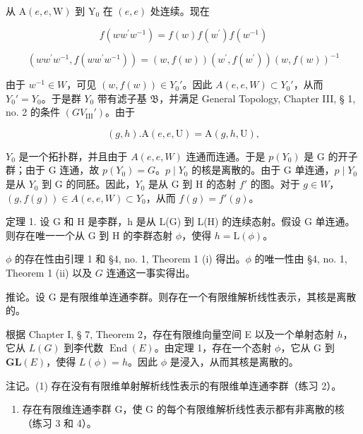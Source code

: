 从 \(\mathrm{A}(e,e,\mathrm{W})\) 到 \(\mathrm{Y}_0\) 在 \((e,e)\) 处连续。现在

\[
f \left(w w ^ {\prime} w ^ {- 1}\right) = f (w) f \left(w ^ {\prime}\right) f \left(w ^ {- 1}\right)
\]

\[
\left(w w ^ {\prime} w ^ {- 1}, f \left(w w ^ {\prime} w ^ {- 1}\right)\right) = (w, f (w)) \left(w ^ {\prime}, f \left(w ^ {\prime}\right)\right) \left(w, f (w)\right) ^ {- 1}
\]

由于 \(w^{-1} \in W\)，可见 \((w, f(w)) \in Y_0'\)。因此 \(A(e, e, W) \subset Y_0'\)，从而 \(Y_0' = Y_0\)。于是群 \(Y_0\) 带有滤子基 \(\mathfrak{B}\)，并满足 General Topology, Chapter III, § 1, no. 2 的条件 \((GV_{\mathrm{III}}')\)。由于

\[
(g, h). \mathrm{A} (e, e, \mathrm{U}) = \mathrm{A} (g, h, \mathrm{U}),
\]

\(Y_{0}\) 是一个拓扑群，并且由于 \(A(e, e, W)\) 连通而连通。于是 \(p(Y_{0})\) 是 G 的开子群；由于 G 连通，故 \(p(Y_{0}) = G\)。\(p \mid Y_{0}\) 的核是离散的。由于 G 单连通，\(p \mid Y_{0}\) 是从 \(Y_{0}\) 到 G 的同胚。因此，\(Y_{0}\) 是从 G 到 H 的态射 \(f'\) 的图。对于 \(g \in W\)，\((g, f(g)) \in A(e, e, W) \subset Y_{0}\)，从而 \(f(g) = f'(g)\)。

定理 1. 设 G 和 H 是李群，h 是从 L(G) 到 L(H) 的连续态射。假设 G 单连通。则存在唯一一个从 G 到 H 的李群态射 \(\phi\)，使得 \(h = \mathrm{L}(\phi)\)。

\(\phi\) 的存在性由引理 1 和 §4, no. 1, Theorem 1 (i) 得出。\(\phi\) 的唯一性由 §4, no. 1, Theorem 1 (ii) 以及 \(G\) 连通这一事实得出。

推论。设 G 是有限维单连通李群。则存在一个有限维解析线性表示，其核是离散的。

根据 Chapter I, § 7, Theorem 2，存在有限维向量空间 E 以及一个单射态射 \(h\)，它从 \(L(G)\) 到李代数 \(\operatorname{End}(E)\)。由定理 1，存在一个态射 \(\phi\)，它从 G 到 \(\mathbf{GL}(E)\)，使得 \(L(\phi) = h\)。因此 \(\phi\) 是浸入，从而其核是离散的。

注记。(1) 存在没有有限维单射解析线性表示的有限维单连通李群（练习 2）。

\begin{enumerate}
\def\labelenumi{(\arabic{enumi})}
\setcounter{enumi}{1}
\tightlist
\item
  存在有限维连通李群 G，使 G 的每个有限维解析线性表示都有非离散的核（练习 3 和 4）。
\end{enumerate}

